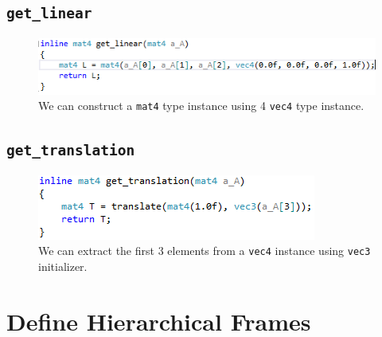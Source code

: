 \documentclass[11pt]{article}
\begin{document}
\subsection{\texttt{get\_linear}} \label{ssec:2.1}

\begin{figure}[htb]
	\begin{center}
		\includegraphics[width=0.8\linewidth]{getLinear.png}
	\end{center}
	\caption{We can construct a \texttt{mat4} type instance using 4 \texttt{vec4} type instance.}
\end{figure}

\subsection{\texttt{get\_translation}} \label{ssec:2.2}

\begin{figure}[htb]
	\begin{center}
		\includegraphics[width=0.8\linewidth]{getTrans.png}
	\end{center}
	\caption{We can extract the first 3 elements from a \texttt{vec4} instance using \texttt{vec3} initializer.}
\end{figure}

\section{Define Hierarchical Frames} \label{sec:3}
\end{document}
